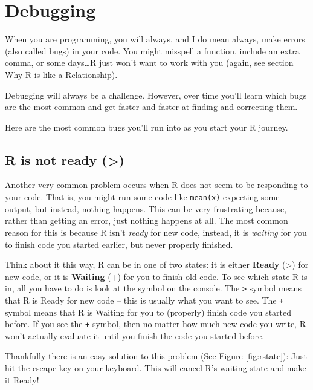 \documentclass[]{book}
\theoremstyle{definition}
\theoremstyle{definition}
\theoremstyle{remark}
\begin{document}
\section{Debugging}\label{debugging}

When you are programming, you will always, and I do mean always, make
errors (also called bugs) in your code. You might misspell a function,
include an extra comma, or some days\ldots{}R just won't want to work
with you (again, see section \protect\hyperlink{rrelationship}{Why R is
like a Relationship}).

Debugging will always be a challenge. However, over time you'll learn
which bugs are the most common and get faster and faster at finding and
correcting them.

Here are the most common bugs you'll run into as you start your R
journey.

\subsection{R is not ready (\textgreater{})}\label{r-is-not-ready}

Another very common problem occurs when R does not seem to be responding
to your code. That is, you might run some code like \texttt{mean(x)}
expecting some output, but instead, nothing happens. This can be very
frustrating because, rather than getting an error, just nothing happens
at all. The most common reason for this is because R isn't \emph{ready}
for new code, instead, it is \emph{waiting} for you to finish code you
started earlier, but never properly finished.

Think about it this way, R can be in one of two states: it is either
\textbf{Ready} (\textgreater{}) for new code, or it is \textbf{Waiting}
(+) for you to finish old code. To see which state R is in, all you have
to do is look at the symbol on the console. The \texttt{\textgreater{}}
symbol means that R is Ready for new code -- this is usually what you
want to see. The \texttt{+} symbol means that R is Waiting for you to
(properly) finish code you started before. If you see the \texttt{+}
symbol, then no matter how much new code you write, R won't actually
evaluate it until you finish the code you started before.

Thankfully there is an easy solution to this problem (See Figure
\ref{fig:rstate}): Just hit the escape key on your keyboard. This will
cancel R's waiting state and make it Ready!
\end{document}
